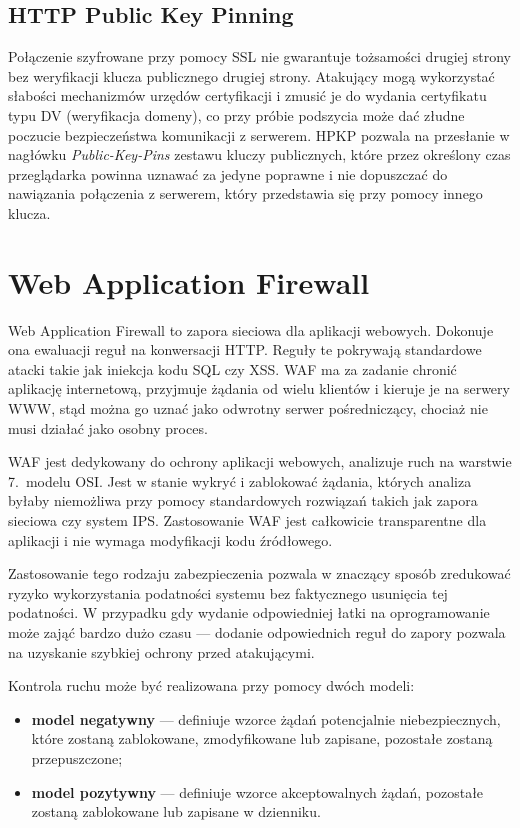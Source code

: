 \documentclass[11pt,a4paper,polish,thesis,oneside]{dcsbook}
\begin{document}
\subsection{HTTP Public Key Pinning}
Połączenie szyfrowane przy pomocy SSL nie gwarantuje tożsamości drugiej strony bez weryfikacji klucza publicznego drugiej strony. Atakujący mogą wykorzystać słabości mechanizmów urzędów certyfikacji i zmusić je do wydania certyfikatu typu DV (weryfikacja domeny), co przy próbie podszycia może dać złudne poczucie bezpieczeństwa komunikacji z serwerem. HPKP pozwala na przesłanie w nagłówku \textit{Public-Key-Pins} zestawu kluczy publicznych, które przez określony czas przeglądarka powinna uznawać za jedyne poprawne i nie dopuszczać do nawiązania połączenia z serwerem, który przedstawia się przy pomocy innego klucza.

\section{Web Application Firewall}
\label{waf}
Web Application Firewall to zapora sieciowa dla aplikacji webowych. Dokonuje ona ewaluacji reguł na konwersacji HTTP. Reguły te pokrywają standardowe atacki takie jak iniekcja kodu SQL czy XSS. WAF ma za zadanie chronić aplikację internetową, przyjmuje żądania od wielu klientów i kieruje je na serwery WWW, stąd można go uznać jako odwrotny serwer pośredniczący, chociaż nie musi działać jako osobny proces.

WAF jest dedykowany do ochrony aplikacji webowych, analizuje ruch na warstwie 7.~modelu OSI. Jest w stanie wykryć i zablokować żądania, których analiza byłaby niemożliwa przy pomocy standardowych rozwiązań takich jak zapora sieciowa czy system IPS. Zastosowanie WAF jest całkowicie transparentne dla aplikacji i nie wymaga modyfikacji kodu źródłowego.

Zastosowanie tego rodzaju zabezpieczenia pozwala w znaczący sposób zredukować ryzyko wykorzystania podatności systemu bez faktycznego usunięcia tej podatności. W przypadku gdy wydanie odpowiedniej łatki na oprogramowanie może zająć bardzo dużo czasu --- dodanie odpowiednich reguł do zapory pozwala na uzyskanie szybkiej ochrony przed atakującymi.

Kontrola ruchu może być realizowana przy pomocy dwóch modeli:
\begin{itemize}
\item \textbf{model negatywny} --- definiuje wzorce żądań potencjalnie niebezpiecznych, które zostaną zablokowane, zmodyfikowane lub zapisane, pozostałe zostaną przepuszczone;
\item \textbf{model pozytywny} --- definiuje wzorce akceptowalnych żądań, pozostałe zostaną zablokowane lub zapisane w dzienniku.
\end{itemize}
\end{document}
